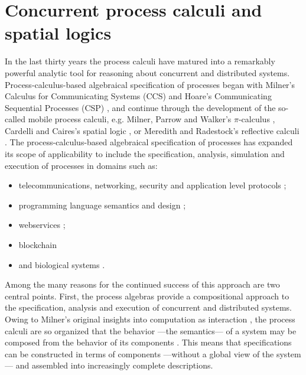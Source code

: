 \section{Concurrent process calculi and spatial logics }\label{sec:concurrent_process_calculi_and_spatial_logics_} %
In the last thirty years the process calculi have matured into a
remarkably powerful analytic tool for reasoning about concurrent and
distributed systems. Process-calculus-based algebraical specification of
processes began with Milner's Calculus for Communicating Systems (CCS)
\cite{MilnerCCS80} and Hoare's Communicating Sequential Processes
(CSP) \cite{CSP} \cite{CSP1} \cite{CSP2} \cite{CSP3}, and continue
through the development of the so-called mobile process calculi,
e.g. Milner, Parrow and Walker's $\pi$-calculus \cite{ParrowWalker},
Cardelli and Caires's spatial logic \cite{CairesC04} \cite{CairesC03}
\cite{Caires04}, or Meredith and Radestock's reflective calculi
\cite{MeredithR05} \cite{meredith2005rho}. The process-calculus-based
algebraical specification of processes has expanded its scope of
applicability to include the specification, analysis, simulation and
execution of processes in domains such as:

\begin{itemize}
\item telecommunications, networking, security and application level protocols
\cite{AbadiB02} 
\cite{AbadiB03} 
\cite{BrownLM05} 
\cite{LaneveZ05}; 
\item programming language semantics and design
\cite{BrownLM05}
\cite{djoin}
\cite{JoCaml}
\cite{WojciechowskiS99};
\item webservices
\cite{BrownLM05}
\cite{LaneveZ05}
\cite{MeredithB03};
\item{blockchain}
  \cite{RChain2022}
\item and biological systems
\cite{Cardelli04}
\cite{DanosL03}
\cite{RegevS03}
\cite{PriamiRSS01}.
\end{itemize}

Among the many reasons for the continued success of this approach are
two central points. First, the process algebras provide a
compositional approach to the specification, analysis and execution of
concurrent and distributed systems. Owing to Milner's original
insights into computation as interaction \cite{Milner93}, the process
calculi are so organized that the behavior ---the semantics--- of a
system may be composed from the behavior of its components
\cite{Fokkink}. This means that specifications can be constructed in
terms of components ---without a global view of the system--- and
assembled into increasingly complete descriptions.

